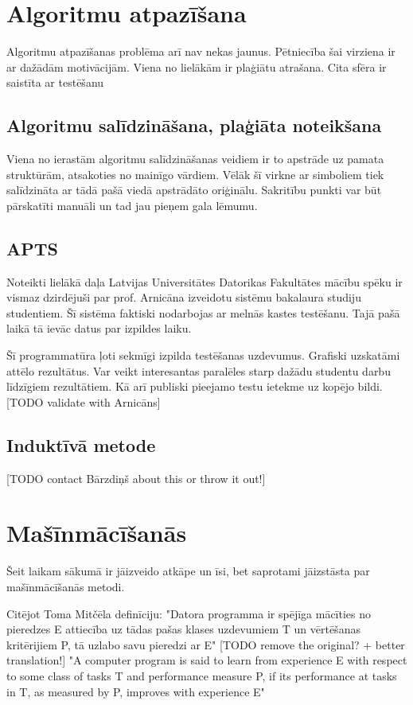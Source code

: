 \section{Algoritmu atpazīšana}
Algoritmu atpazīšanas problēma arī nav nekas jaunus. Pētniecība šai virziena ir ar dažādām motivācijām. Viena no lielākām ir plaģiātu atrašana. Cita sfēra ir saistīta ar testēšanu

\subsection{Algoritmu salīdzināšana, plaģiāta noteikšana}
Viena no ierastām algoritmu salīdzināšanas veidiem ir to apstrāde uz pamata struktūrām, atsakoties no mainīgo vārdiem. Vēlāk šī virkne ar simboliem tiek salīdzināta ar tādā pašā viedā apstrādāto oriģinālu. Sakritību punkti var būt pārskatīti manuāli un tad jau pieņem gala lēmumu.


\subsection{APTS}
Noteikti lielākā daļa Latvijas Universitātes Datorikas Fakultātes mācību spēku ir vismaz dzirdējuši par prof. Arnicāna izveidotu sistēmu bakalaura studiju studentiem. Šī sistēma faktiski nodarbojas ar melnās kastes testēšanu. Tajā pašā laikā tā ievāc datus par izpildes laiku. 

Šī programmatūra ļoti sekmīgi izpilda testēšanas uzdevumus. Grafiski uzskatāmi attēlo rezultātus. Var veikt interesantas paralēles starp dažādu studentu darbu līdzīgiem rezultātiem. Kā arī publiski pieejamo testu ietekme uz kopējo bildi.
[TODO validate with Arnicāns]

\subsection{Induktīvā metode}
[TODO contact Bārzdiņš about this or throw it out!]

\section{Mašīnmācīšanās}
Šeit laikam sākumā ir jāizveido atkāpe un īsi, bet saprotami jāizstāsta par mašīnmācīšanās metodi. 

Citējot Toma Mitčēla definīciju: "Datora programma ir spējīga mācīties no pieredzes E attiecība uz tādas pašas klases uzdevumiem T un vērtēšanas kritērijiem P, tā uzlabo savu pieredzi ar E"
[TODO remove the original? + better translation!]
"A computer program is said to learn from experience E with respect to some class of tasks T and performance measure P, if its performance at tasks in T, as measured by P, improves with experience E" 

